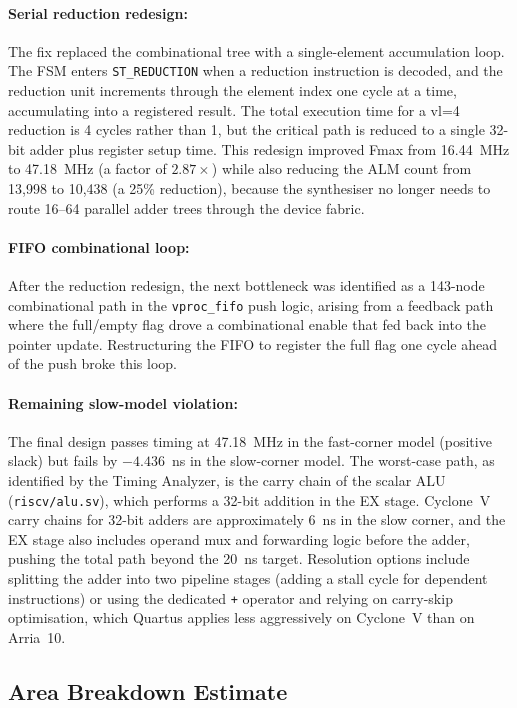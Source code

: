 \paragraph{Serial reduction redesign:}
The fix replaced the combinational tree with a single-element accumulation loop. The
FSM enters \texttt{ST\_REDUCTION} when a reduction instruction is decoded, and the
reduction unit increments through the element index one cycle at a time, accumulating
into a registered result. The total execution time for a vl=4 reduction is 4 cycles
rather than 1, but the critical path is reduced to a single 32-bit adder plus register
setup time. This redesign improved Fmax from 16.44~MHz to 47.18~MHz (a factor of
$2.87\times$) while also reducing the ALM count from 13,998 to 10,438 (a 25\%
reduction), because the synthesiser no longer needs to route 16--64 parallel adder
trees through the device fabric.

\paragraph{FIFO combinational loop:}
After the reduction redesign, the next bottleneck was identified as a 143-node
combinational path in the \texttt{vproc\_fifo} push logic, arising from a feedback
path where the full/empty flag drove a combinational enable that fed back into the
pointer update. Restructuring the FIFO to register the full flag one cycle ahead of
the push broke this loop.

\paragraph{Remaining slow-model violation:}
The final design passes timing at 47.18~MHz in the fast-corner model (positive slack)
but fails by $-4.436$~ns in the slow-corner model. The worst-case path, as identified
by the Timing Analyzer, is the carry chain of the scalar ALU (\texttt{riscv/alu.sv}),
which performs a 32-bit addition in the EX stage. Cyclone~V carry chains for 32-bit
adders are approximately 6~ns in the slow corner, and the EX stage also includes
operand mux and forwarding logic before the adder, pushing the total path beyond the
20~ns target. Resolution options include splitting the adder into two pipeline stages
(adding a stall cycle for dependent instructions) or using the dedicated \texttt{+}
operator and relying on carry-skip optimisation, which Quartus applies less
aggressively on Cyclone~V than on Arria~10.

\subsection{Area Breakdown Estimate}

